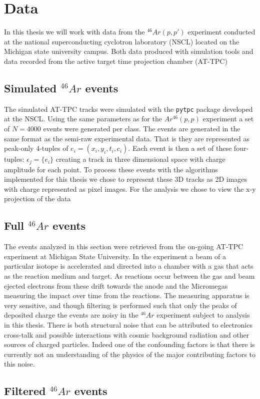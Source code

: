 \section{Data}

In this thesis we will work with data from the ${}^46Ar(p, p')$ experiment conducted at the national superconducting cyclotron laboratory (NSCL) located on the Michigan state university campus. Both data produced with simulation tools and data recorded from the active target time projection chamber (AT-TPC)

\subsection{Simulated ${}^46Ar$ events} 

The simulated AT-TPC tracks were simulated with the \lstinline{pytpc} package developed at the NSCL. Using the same parameters as for the $Ar^{46}(p, p)$ experiment a set of $N=4000$ events were generated per class. The events are generated in the same format as the semi-raw experimental data. That is they are represented as peak-only 4-tuples of $e_i = (x_i, y_i, t_i, c_i)$. Each event is then a set of these four-tuples: $\epsilon_j = \{e_i\}$ creating a track in three dimensional space with charge amplitude for each point. To process these events with the algorithms implemented for this thesis we chose to represent these 3D tracks as 2D images with charge represented as pixel images. For the analysis we chose to view the x-y projection of the data 

\subsection{Full ${}^46Ar$ events}

The events analyzed in this section were retrieved from the on-going AT-TPC experiment at Michigan State University. In the experiment a beam of a particular isotope is accelerated and directed into a chamber with a gas that acts as the reaction medium and target. As reactions occur between the gas and beam ejected electrons from these drift towards the anode and the Micromegas measuring the impact over time from the reactions. The measuring apparatus is very sensitive, and though filtering is performed such that only the peaks of deposited charge the events are noisy in the ${}^46Ar$ experiment subject to analysis in this thesis. There is both structural noise that can be attributed to electronics cross-talk and possible interactions with cosmic background radiation and other sources of charged particles. Indeed one of the confounding factors is that there is currently not an understanding of the physics of the major contributing factors to this noise. 


\subsection{Filtered ${}^46Ar$ events}

